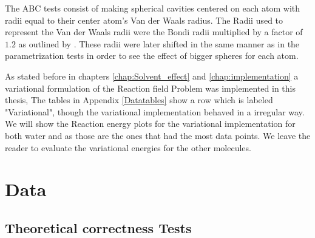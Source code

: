 \documentclass[../master_thesis.tex]{subfiles}
\begin{document}
The \ac{ABC} tests consist of making spherical cavities centered on
each atom with radii equal to their center atom's Van der Waals radius. The Radii
used to represent the Van der Waals radii were the Bondi radii multiplied by a factor of
$1.2$ as outlined by \cite{Tomasi:1994wt}. These radii were later shifted in the same manner
as in the parametrization tests in order to see the effect of bigger spheres for each
atom.

As stated before in chapters \ref{chap:Solvent_effect} and \ref{chap:implementation}
a variational formulation of the Reaction field Problem was implemented in this thesis,
The tables in Appendix \ref{Datatables} show a row which is labeled "Variational",
though the variational implementation behaved in a irregular way. We will show
the Reaction energy plots for the variational implementation for both water
and  as those are the ones that had the most data points. We leave the
reader to evaluate the variational energies for the other molecules.


\section{Data}
\subsection{Theoretical correctness Tests}
\end{document}
